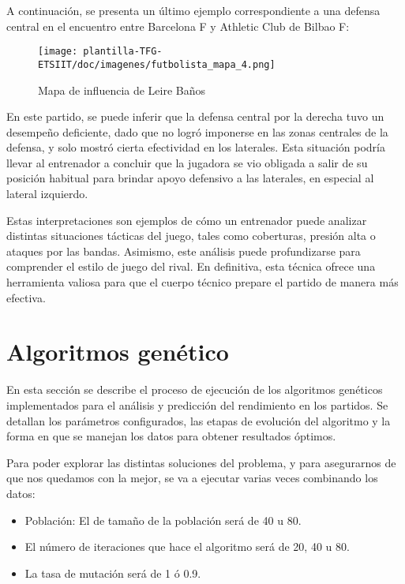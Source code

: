 A continuación, se presenta un último ejemplo correspondiente a una defensa central en el encuentro entre Barcelona F y Athletic Club de Bilbao F:

\begin{figure}[H]
    \centering
    \texttt{[image: plantilla-TFG-ETSIIT/doc/imagenes/futbolista\_mapa\_4.png]}
    \caption{Mapa de influencia de Leire Baños}
    \label{fig:etiqueta-imagen}
\end{figure}

En este partido, se puede inferir que la defensa central por la derecha tuvo un desempeño deficiente, dado que no logró imponerse en las zonas centrales de la defensa, y solo mostró cierta efectividad en los laterales. Esta situación podría llevar al entrenador a concluir que la jugadora se vio obligada a salir de su posición habitual para brindar apoyo defensivo a las laterales, en especial al lateral izquierdo.

Estas interpretaciones son ejemplos de cómo un entrenador puede analizar distintas situaciones tácticas del juego, tales como coberturas, presión alta o ataques por las bandas. Asimismo, este análisis puede profundizarse para comprender el estilo de juego del rival. En definitiva, esta técnica ofrece una herramienta valiosa para que el cuerpo técnico prepare el partido de manera más efectiva.

\section{Algoritmos genético}
En esta sección se describe el proceso de ejecución de los algoritmos genéticos implementados para el análisis y predicción del rendimiento en los partidos. Se detallan los parámetros configurados, las etapas de evolución del algoritmo y la forma en que se manejan los datos para obtener resultados óptimos. 

Para poder explorar las distintas soluciones del problema, y para asegurarnos de que nos quedamos con la mejor, se va a ejecutar varias veces combinando los datos:

\begin{itemize}
    \item Población: El de tamaño de la población será de 40 u 80.
    \item El número de iteraciones que hace el algoritmo será de 20, 40 u 80.
    \item La tasa de mutación será de 1 ó 0.9.
\end{itemize}

